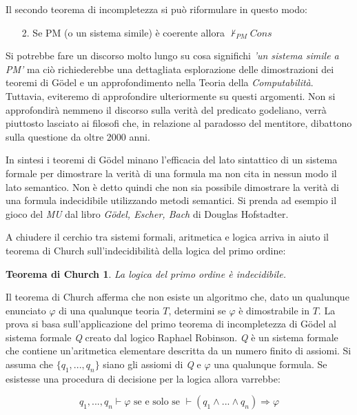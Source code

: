 \documentclass[./main.tex]{subfiles}
\begin{document}
Il secondo teorema di incompletezza si può riformulare in questo modo:

\begin{enumerate}
  \item[2.] Se PM (o un sistema simile) è coerente allora $\nvdash_{PM} Cons$
\end{enumerate}

Si potrebbe fare un discorso molto lungo su cosa significhi \textit{'un sistema simile a PM'} ma 
ciò richiederebbe una dettagliata esplorazione delle dimostrazioni dei teoremi di
Gödel e un approfondimento nella Teoria della \textit{Computabilità}. Tuttavia, eviteremo di approfondire ulteriormente su questi argomenti.
Non si approfondirà nemmeno il discorso sulla verità del predicato godeliano, verrà piuttosto lasciato 
ai filosofi che, in relazione al paradosso del mentitore, dibattono sulla questione da oltre 2000 anni.

In sintesi i teoremi di Gödel minano l'efficacia del lato sintattico di un sistema formale per dimostrare la verità di una formula
ma non cita in nessun modo il lato semantico. Non è detto quindi che non sia possibile dimostrare la verità di una formula indecidibile
utilizzando metodi semantici. Si prenda ad esempio il gioco del \textit{MU} dal libro \textit{Gödel, Escher, Bach} di Douglas Hofstadter.

A chiudere il cerchio tra sistemi formali, aritmetica e logica arriva in aiuto il teorema di Church sull'indecidibilità 
della logica del primo ordine:

\newtheorem{theorem}{Teorema di Church}
\begin{theorem}
  La logica del primo ordine è indecidibile.
\end{theorem}

Il teorema di Church afferma che non esiste un algoritmo che, dato un qualunque enunciato $\varphi$ di una qualunque teoria $T$,
determini se $\varphi$ è dimostrabile in $T$.
La prova si basa sull'applicazione del primo teorema di incompletezza di Gödel al sistema formale \textit{Q}
creato dal logico Raphael Robinson. 
\textit{Q} è un sistema formale che contiene un'aritmetica elementare descritta da un numero finito di assiomi.
Si assuma che $\{q_1, ..., q_n\}$ siano gli assiomi di \textit{Q} e $\varphi$ una qualunque formula.
Se esistesse una procedura di decisione per la logica allora varrebbe:

$$ q_1, ..., q_n \vdash \varphi \text{ se e solo se } \vdash (q_1 \land ... \land q_n) \Rightarrow \varphi$$
\end{document}

